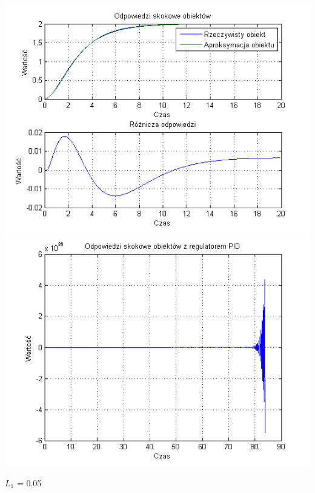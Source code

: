 \documentclass[10pt,a4paper]{article}
\begin{document}
\begin{center}
\includegraphics[scale=1]{images/dwa/skrypt_173.png}\\
\includegraphics[scale=1]{images/dwa/skrypt_174.png}\\
\end{center}
\newpage
$L_1$ = 0.05
\end{document}

